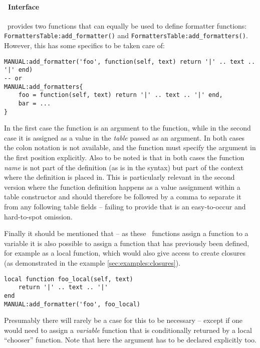 \documentclass[12pt]{scrartcl}
\begin{document}
\paragraph{\luaformatters\ Interface}

\luaformatters\ provides two functions that can equally be used to define
formatter functions: \texttt{FormattersTable:add_formatter()} and
\texttt{FormattersTable:add_formatters()}.  However, this has some
specifics to be taken care of:

\begin{verbatim}
MANUAL:add_formatter('foo', function(self, text) return '|' .. text .. '|' end)
-- or
MANUAL:add_formatters{
	foo = function(self, text) return '|' .. text .. '|' end,
	bar = ...
}
\end{verbatim}

\noindent In the first case the function is an argument to the
 function, while in the second case it is assigned as a
value in the \emph{table} passed as an argument.  In both cases the colon
notation is not available, and the function must specify the 
argument in the first position explicitly.  Also to be noted is that in both
cases the function \emph{name} is not part of the definition (as is in the
 syntax) but part of the context where the definition is
placed in.  This is particularly relevant in the second version where the
function definition happens as a value assignment within a table constructor and
should therefore be followed by a comma to separate it from any following table
fields -- failing to provide that is an easy-to-occur and hard-to-spot omission.

Finally it should be mentioned that -- as these \luaformatters\ functions assign
a function to a variable it is also possible to assign a function that has
previously been defined, for example as a local function, which would also give
access to create closures (as demonstrated in the example
\vref{sec:examples:closures}).

\begin{verbatim}
local function foo_local(self, text)
    return '|' .. text .. '|'
end
MANUAL:add_formatter('foo', foo_local)
\end{verbatim}

\noindent Presumably there will rarely be a case for this to be necessary --
except if one would need to assign a \emph{variable} function that is
conditionally returned by a local “chooser” function.  Note that here the
 argument has to be declared explicitly too.
\end{document}
